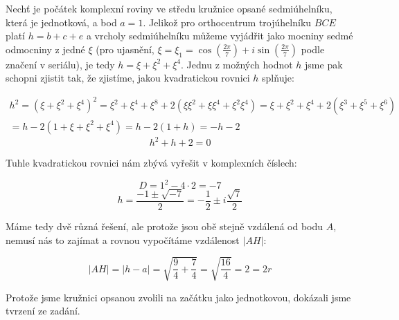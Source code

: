 \documentclass{fkssolpub}
\author{Ondřej Sedláček}
\begin{document}
 

Nechť je počátek komplexní roviny ve středu kružnice opsané sedmiúhelníku,
která je jednotková, a bod $a = 1$. Jelikož pro orthocentrum trojúhelníku 
$BCE$ platí $h = b + c + e$ a vrcholy sedmiúhelníku můžeme vyjádřit jako
mocniny sedmé odmocniny z jedné $\xi$ (pro ujasnění, $\xi = \xi_1
 = \cos\left(\frac{2\pi}{7}\right) + i \sin\left(\frac{2\pi}{7}\right)$ podle
značení v seriálu), je tedy $h = \xi + \xi^2 + \xi^4$. Jednu z možných
hodnot $h$ jsme pak schopni zjistit tak, že zjistíme, jakou kvadratickou
rovnici $h$ splňuje:

\begin{gather*}
  h^2 = (\xi + \xi^2 + \xi^4)^2 = \xi^2 + \xi^4 + \xi^8 + 2(\xi \xi^2
   + \xi \xi^4 + \xi^2 \xi^4) = \xi + \xi^2 + \xi^4 + 2(\xi^3 + \xi^5
   + \xi^6) \\ = h - 2(1 + \xi + \xi^2 + \xi^4) = h - 2(1 + h) = - h - 2
\end{gather*}
\[
  h^2 + h + 2 = 0
\]

Tuhle kvadratickou rovnici nám zbývá vyřešit v komplexních číslech:

\[
  D = 1^2 - 4 \cdot 2 = -7
\]
\[
  h = \frac{-1 \pm \sqrt{-7}}{2} = -\frac{1}{2} \pm i \frac{\sqrt{7}}{2}
\]

Máme tedy dvě různá řešení, ale protože jsou obě stejně vzdálená od
bodu $A$, nemusí nás to zajímat a rovnou vypočítáme vzdálenost $|AH|$:

\[
  |AH| = |h - a| = \sqrt{\frac{9}{4} + \frac{7}{4}} = \sqrt{\frac{16}{4}} = 2
    = 2r
\]

Protože jsme kružnici opsanou zvolili na začátku jako jednotkovou, dokázali
jsme tvrzení ze zadání.
\end{document}
